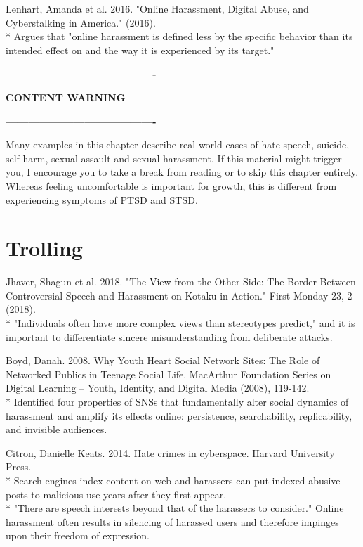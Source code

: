 \documentclass[class=book, crop=false]{standalone}
\begin{document}
Lenhart, Amanda et al. 2016. "Online Harassment, Digital Abuse, and Cyberstalking in America." (2016).\\
 * Argues that "online harassment is defined less by the specific behavior than its intended effect on and the way it is experienced by its target."

\textbf{----------------------------------------}

\textbf{CONTENT WARNING}

\textbf{----------------------------------------}

Many examples in this chapter describe real-world cases of hate speech, suicide, self-harm, sexual assault and sexual harassment. If this material might trigger you, I encourage you to take a break from reading or to skip this chapter entirely. Whereas feeling uncomfortable is important for growth, this is different from experiencing symptoms of PTSD and STSD.

\section{Trolling}

Jhaver, Shagun et al. 2018. "The View from the Other Side: The Border Between Controversial Speech and Harassment on Kotaku in Action." First Monday 23, 2 (2018).\\
 * "Individuals often have more complex views than stereotypes predict," and it is important to differentiate sincere misunderstanding from deliberate attacks.

Boyd, Danah. 2008. Why Youth Heart Social Network Sites: The Role of Networked Publics in Teenage Social Life. MacArthur Foundation Series on Digital Learning -- Youth, Identity, and Digital Media (2008), 119-142.\\
 * Identified four properties of SNSs that fundamentally alter social dynamics of harassment and amplify its effects online: persistence, searchability, replicability, and invisible audiences.

Citron, Danielle Keats. 2014. Hate crimes in cyberspace. Harvard University Press.\\
 * Search engines index content on web and harassers can put indexed abusive posts to malicious use years after they first appear.\\
 * "There are speech interests beyond that of the harassers to consider." Online harassment often results in silencing of harassed users and therefore impinges upon their freedom of expression.
\end{document}
